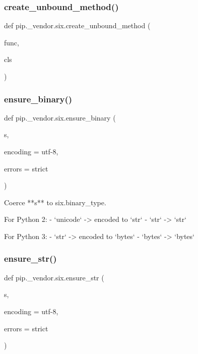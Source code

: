 \subsubsection{\texorpdfstring{create\+\_\+unbound\+\_\+method()}{create\_unbound\_method()}}
{\footnotesize\ttfamily def pip.\+\_\+vendor.\+six.\+create\+\_\+unbound\+\_\+method (\begin{DoxyParamCaption}\item[{}]{func,  }\item[{}]{cls }\end{DoxyParamCaption})}

\mbox{\label{namespacepip_1_1__vendor_1_1six_a319fd5a3c0d49137138153dc3a9cda82}} 
\subsubsection{\texorpdfstring{ensure\+\_\+binary()}{ensure\_binary()}}
{\footnotesize\ttfamily def pip.\+\_\+vendor.\+six.\+ensure\+\_\+binary (\begin{DoxyParamCaption}\item[{}]{s,  }\item[{}]{encoding = {\ttfamily \textquotesingle{}utf-\/8\textquotesingle{}},  }\item[{}]{errors = {\ttfamily \textquotesingle{}strict\textquotesingle{}} }\end{DoxyParamCaption})}

\begin{DoxyVerb}Coerce **s** to six.binary_type.

For Python 2:
  - `unicode` -> encoded to `str`
  - `str` -> `str`

For Python 3:
  - `str` -> encoded to `bytes`
  - `bytes` -> `bytes`
\end{DoxyVerb}
 \mbox{\label{namespacepip_1_1__vendor_1_1six_a494d3bb38ecf30f9b4a6ccc59d67bc30}} 
\subsubsection{\texorpdfstring{ensure\+\_\+str()}{ensure\_str()}}
{\footnotesize\ttfamily def pip.\+\_\+vendor.\+six.\+ensure\+\_\+str (\begin{DoxyParamCaption}\item[{}]{s,  }\item[{}]{encoding = {\ttfamily \textquotesingle{}utf-\/8\textquotesingle{}},  }\item[{}]{errors = {\ttfamily \textquotesingle{}strict\textquotesingle{}} }\end{DoxyParamCaption})}

